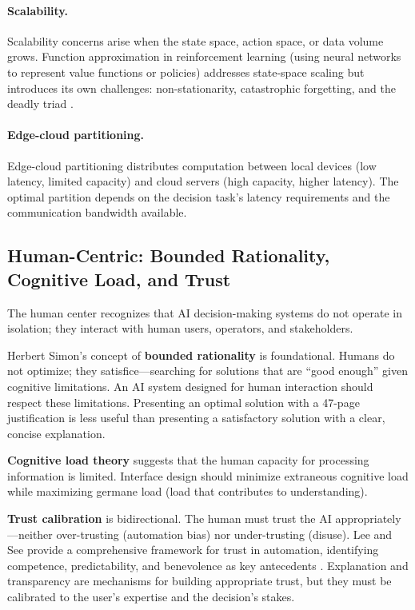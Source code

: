 \documentclass[11pt,a4paper]{article}
\begin{document}
\paragraph{Scalability.} Scalability concerns arise when the state space, action space, or data volume grows. Function approximation in reinforcement learning (using neural networks to represent value functions or policies) addresses state-space scaling but introduces its own challenges: non-stationarity, catastrophic forgetting, and the deadly triad \citep{sutton2018reinforcement}.

\paragraph{Edge-cloud partitioning.} Edge-cloud partitioning distributes computation between local devices (low latency, limited capacity) and cloud servers (high capacity, higher latency). The optimal partition depends on the decision task's latency requirements and the communication bandwidth available.

\subsection{Human-Centric: Bounded Rationality, Cognitive Load, and Trust}

The human center recognizes that AI decision-making systems do not operate in isolation; they interact with human users, operators, and stakeholders.

Herbert Simon's concept of \textbf{bounded rationality} \citep{simon1955behavioral} is foundational. Humans do not optimize; they satisfice---searching for solutions that are ``good enough'' given cognitive limitations. An AI system designed for human interaction should respect these limitations. Presenting an optimal solution with a 47-page justification is less useful than presenting a satisfactory solution with a clear, concise explanation.

\textbf{Cognitive load theory} \citep{sweller1988cognitive} suggests that the human capacity for processing information is limited. Interface design should minimize extraneous cognitive load while maximizing germane load (load that contributes to understanding).

\textbf{Trust calibration} is bidirectional. The human must trust the AI appropriately---neither over-trusting (automation bias) nor under-trusting (disuse). Lee and See provide a comprehensive framework for trust in automation, identifying competence, predictability, and benevolence as key antecedents \citep{lee2004trust}. Explanation and transparency are mechanisms for building appropriate trust, but they must be calibrated to the user's expertise and the decision's stakes.
\end{document}
